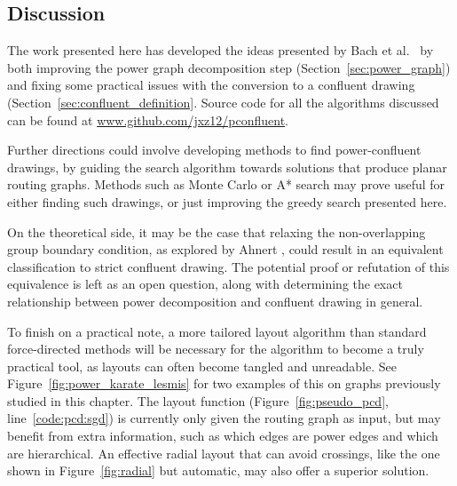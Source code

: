 \subsection{Discussion}
\label{sec:power_discussion}
The work presented here has developed the ideas presented by Bach et al.\ \cite{Bach2017} by both improving the power graph decomposition step (Section~\ref{sec:power_graph}) and fixing some practical issues with the conversion to a confluent drawing (Section~\ref{sec:confluent_definition}. Source code for all the algorithms discussed can be found at \url{www.github.com/jxz12/pconfluent}.

Further directions could involve developing methods to find power-confluent drawings, by guiding the search algorithm towards solutions that produce planar routing graphs.
Methods such as Monte Carlo or A* search may prove useful for either finding such drawings, or just improving the greedy search presented here.

On the theoretical side, it may be the case that relaxing the non-overlapping group boundary condition, as explored by Ahnert \cite{Ahnert2014}, could result in an equivalent classification to strict confluent drawing.
The potential proof or refutation of this equivalence is left as an open question, along with determining the exact relationship between power decomposition and confluent drawing in general.

To finish on a practical note, a more tailored layout algorithm than standard force-directed methods will be necessary for the algorithm to become a truly practical tool, as layouts can often become tangled and unreadable. See Figure~\ref{fig:power_karate_lesmis} for two examples of this on graphs previously studied in this chapter.
The layout function (Figure~\ref{fig:pseudo_pcd}, line~\ref{code:pcd:sgd}) is currently only given the routing graph as input, but may benefit from extra information, such as which edges are power edges and which are hierarchical. An effective radial layout that can avoid crossings, like the one shown in Figure~\ref{fig:radial} but automatic, may also offer a superior solution.

